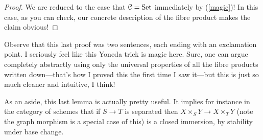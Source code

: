 \begin{proof}
  We are reduced to the case that $\mathcal{C} = \mathrm{Set}$ immediately by
  (\ref{magic})! In this case, as you can check, our concrete
  description of the fibre product makes the claim obvious!
\end{proof}

Observe that this last proof was two sentences, each ending with an
exclamation point. I seriously feel like this Yoneda trick is magic
here. Sure, one can argue completely abstractly using only the
universal properties of all the fibre products written down---that's
how I proved this the first time I saw it---but this is just so much
cleaner and intuitive, I think!

\begin{remark}
  As an aside, this last lemma is actually pretty useful. It implies
  for instance in the category of schemes that if $S \to T$ is
  separated then $X \times_S Y \to X \times_T Y$ (note the graph
  morphism is a special case of this) is a closed immersion, by
  stability under base change.
\end{remark}






